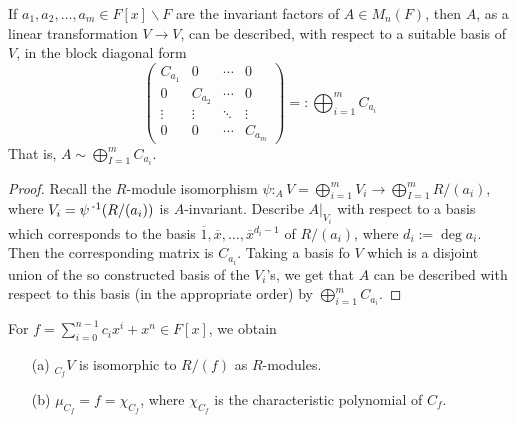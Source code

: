 \documentclass[11pt]{book}
\theoremstyle{definition}   \newtheorem{defn}[counter]{Definition} %
\newcommand{\ov}{\overline}   \newcommand{\wt}{\widetilde}
\newcommand{\bs}{\backslash}   \newcommand{\A}{\mathcal{A}}   \newcommand{\sy}{\textnormal{Syl}}   \newcommand{\size}[1]{\left| #1 \right|}
\newcommand{\mymatrix}[2]{\left( \begin{array}{#1} #2 \end{array} \right)}
\DeclareMathOperator{\ra}{\rightarrow}   \DeclareMathOperator{\Poly}{\mathbf{P}}   \DeclareMathOperator{\spn}{\textnormal{span}}   \DeclareMathOperator{\aut}{\textnormal{Aut}}
\newcommand{\vs}{\vspace{8pt}}
\numberwithin{counter}{chapter}
\begin{document}
\begin{corollary}
If $a_1,a_2,\dots,a_m \in F[x]\bs F$ are the invariant factors of $A \in M_n(F)$, then $A$, as a linear transformation $V \ra V$, can be described, with respect to a suitable basis of $V$, in the block diagonal form
	\[\mymatrix{cccc}{C_{a_1} & 0 & \cdots & 0 \\
	                  0 & C_{a_2} & \cdots & 0 \\
	                  \vdots & \vdots & \ddots & \vdots \\
	                  0 & 0 & \cdots & C_{a_m}} =: \bigoplus_{i=1}^m C_{a_i} \]
That is, $A \sim \bigoplus_{I=1}^m C_{a_i}$.
\end{corollary}

\begin{proof}
Recall the $R$-module isomorphism $\psi : _AV = \bigoplus_{i=1}^m V_i \ra \bigoplus_{I=1}^m R/(a_i)$, where $V_i = \psi\operatorname{^{-1}}(R/(a_i))$ is $A$-invariant. Describe $A|_{V_i}$ with respect to a basis which corresponds to the basis $\ov{1},\ov{x},\dots,\ov{x}^{d_{i} - 1}$ of $R/(a_i)$, where $d_i := \deg a_i$. Then the corresponding matrix is $C_{a_i}$. Taking a basis fo $V$ which is a disjoint union of the so constructed basis of the $V_i$'s, we get that $A$ can be described with respect to this basis (in the appropriate order) by $\bigoplus_{i=1}^m C_{a_i}$.
\end{proof}

\vs

\begin{lemma}
For $f = \sum_{i=0}^{n-1} c_i x^i + x^n \in F[x]$, we obtain
\begin{enumerate}
\item[(a)] $_{C_f}V$ is isomorphic to $R/(f)$ as $R$-modules.
\item[(b)] $\mu_{C_f} = f = \chi_{C_f}$, where $\chi_{C_f}$ is the characteristic polynomial of $C_f$.
\end{enumerate}
\end{lemma}
\end{document}
